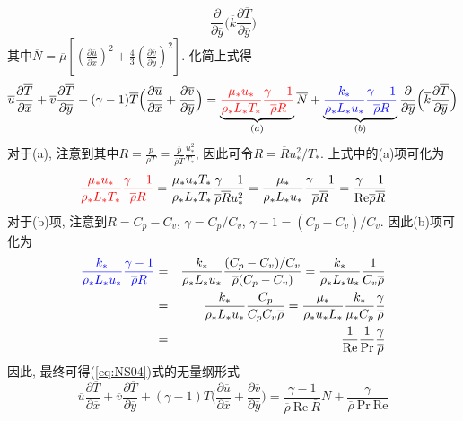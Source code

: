\begin{solution}
\begin{itemize}
\[\frac{\partial}{\partial\overline{y}}
\Big(\overline{k}\frac{\partial\overline{T}}{\partial\overline{y}}\Big)
\]
其中$\overline{N}=\overline{\mu}
[(\frac{\partial\overline{u}}{\partial\overline{x}})^{2}
+\frac{4}{3}(\frac{\partial\overline{v}}{\partial\overline{y}})^{2}]$. 化简上式得
\[
\overline{u}\frac{\partial\overline{T}}{\partial\overline{x}}
+\overline{v}\frac{\partial\overline{T}}{\partial\overline{y}}
+(\gamma-1)\overline{T}\Big(\frac{\partial\overline{u}}{\partial\overline{x}}
+\frac{\partial\overline{v}}{\partial\overline{y}}\Big)
=
\underbrace{\textcolor{red}{\frac{\mu_{*}u_{*}}{\rho_{*}L_{*}T_{*}}
\frac{\gamma-1}{\overline{\rho}R}
}}_{(a)}\overline{N}
+\underbrace{\textcolor{blue}{\frac{k_*}{\rho_{*}L_{*}u_{*}}
\frac{\gamma-1}{\overline{\rho}R}}}_{(b)}
\frac{\partial}{\partial\overline{y}}
\Big(\overline{k}\frac{\partial\overline{T}}{\partial\overline{y}}\Big)
\]
对于(a), 注意到其中$R=\frac{p}{\rho T}=\frac{\overline{p}}{\overline{\rho}\overline{T}}\frac{u_*^2}{T_*}$, 因此可令$R=\overline{R}u_*^2/T_*$. 上式中的(a)项可化为
\[
\textcolor{red}{\frac{\mu_{*}u_{*}}{\rho_{*}L_{*}T_{*}}
\frac{\gamma-1}{\overline{\rho}R}}
=
\frac{\mu_{*}u_{*}T_{*}}{\rho_{*}L_{*}T_{*}}
\frac{\gamma-1}{\overline{\rho}\overline{R}u_{*}^2}
=
\frac{\mu_{*}}{\rho_{*}L_{*}u_{*}}
\frac{\gamma-1}{\overline{\rho}\overline{R}}
=
\frac{\gamma-1}{\textrm{Re} \overline{\rho}\overline{R}}
\]
对于(b)项, 注意到$R=C_p-C_v$, $\gamma=C_p/C_v$, $\gamma - 1 = (C_p -C_v)/C_v$. 因此(b)项可化为
{\setlength\arraycolsep{2pt}
\begin{eqnarray}
\textcolor{blue}{\frac{k_*}{\rho_{*}L_{*}u_{*}}
\frac{\gamma-1}{\overline{\rho}R}}
&=&
\frac{k_*}{\rho_{*}L_{*}u_{*}}
\frac{(C_p -C_v)/C_v}{\overline{\rho}(C_p-C_v)}
=
\frac{k_*}{\rho_{*}L_{*}u_{*}}
\frac{1}{C_v\overline{\rho}}
\nonumber\\
&=&
\frac{k_*}{\rho_{*}L_{*}u_{*}}
\frac{C_p}{C_p C_v\overline{\rho}}
=
\frac{\mu_*}{\rho_{*}u_{*}L_{*}}
\frac{k_*}{\mu_*C_p}
\frac{\gamma}{\overline{\rho}}
\nonumber\\
&=&
\frac{1}{\textrm{Re}}
\frac{1}{\textrm{Pr}}
\frac{\gamma}{\overline{\rho}}\nonumber
\end{eqnarray}}
因此, 最终可得(\ref{eq:NS04})式的无量纲形式
\[
\overline{u}\frac{\partial\overline{T}}{\partial\overline{x}}
+\overline{v}\frac{\partial\overline{T}}{\partial\overline{y}}
+(\gamma-1)\overline{T}\Big(\frac{\partial\overline{u}}{\partial\overline{x}}
+\frac{\partial\overline{v}}{\partial\overline{y}}\Big)
=
\frac{\gamma-1}{\overline{\rho}~\textrm{Re}~\overline{R}}
\overline{N}+
\frac{\gamma}{\overline{\rho}~\textrm{Pr}~\textrm{Re}}
\]
\end{itemize}
\end{solution}
